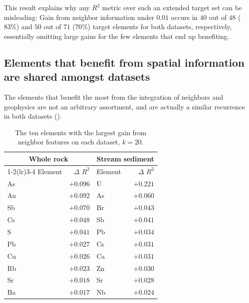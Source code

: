 \documentclass[
    a4paper,
    11pt,
    oneside,
    numbers=noendperiod,
    abstract=true
]{scrartcl}
\newcommand{\Rsq}{$R^2$}
\begin{document}
This result explains why any \Rsq{} metric over such an extended target set can be misleading: Gain from neighbor information under $0.01$ occurs in $40$ out of $48$ ($83\%$) and $50$ out of $71$ ($70\%$) target elements for both datasets, respectively, essentially omitting large gains for the few elements that end up benefiting.

\subsection{Elements that benefit from spatial information are shared amongst datasets}
\label{sec:pathfinders}

The elements that benefit the most from the integration of neighbors and geophysics are not an arbitrary assortment, and are actually a similar recurrence in both datasets (). 


\begin{table}[H]
\centering
\caption[Elements with the largest neighbour gain]{The ten elements with the largest gain from
neighbor features on each dataset, $k=20$.}
\label{tab:pathfinders1}
\begin{tabular}{lrlr}
\toprule
\multicolumn{2}{c}{Whole rock} & \multicolumn{2}{c}{Stream sediment} \\
\cmidrule(lr){1-2}\cmidrule(lr){3-4}
Element & $\Delta$ \Rsq{} & Element & $\Delta$ \Rsq{} \\
\midrule
As  & $+0.096$ & U   & $\mathbf{+0.221}$ \\
  Au  & $+0.092$ & As  & $+0.060$ \\
  Sb  & $+0.070$ & Br  & $+0.043$ \\
  Cs  & $+0.048$ & Sb  & $+0.041$ \\
  S   & $+0.041$ & Pb  & $+0.034$ \\
  Pb  & $+0.027$ & Cs  & $+0.031$ \\
  Cu  & $+0.026$ & Ca  & $+0.031$ \\
  Rb  & $+0.023$ & Zn  & $+0.030$ \\
  Sr  & $+0.018$ & Sr  & $+0.028$ \\
  Ba  & $+0.017$ & Nb  & $+0.024$ \\
\bottomrule
\end{tabular}
\end{table}
\end{document}
